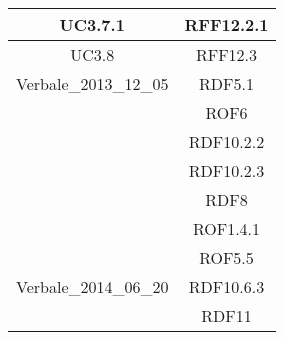 \begin{longtable}{|c|c|}
\midrule
UC3.7.1
& RFF12.2.1\\

\midrule
UC3.8
& RFF12.3\\

\midrule
Verbale\_2013\_12\_05
& RDF5.1\\
& ROF6\\
& RDF10.2.2\\
& RDF10.2.3\\
& RDF8\\
& ROF1.4.1\\
& ROF5.5\\

\midrule
Verbale\_2014\_06\_20
& RDF10.6.3\\
& RDF11\\


\end{longtable}


